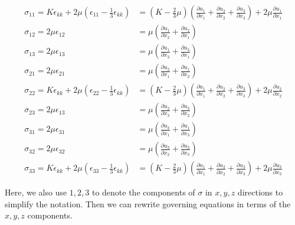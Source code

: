 \begin{align}
    \sigma_{11} = K\epsilon_{kk} + 2\mu (\epsilon_{11} - \frac{1}{3}\epsilon_{kk}) &= (K - \frac{2}{3}\mu)( \frac{\partial u_1}{\partial x_1} + \frac{\partial u_2}{\partial x_2} + \frac{\partial u_3}{\partial x_3}) + 2\mu \frac{\partial u_1}{\partial x_1} \\
    \sigma_{12} = 2\mu \epsilon_{12} &= \mu(\frac{\partial u_1}{\partial x_2} + \frac{\partial u_2}{\partial x_1}) \\
    \sigma_{13} = 2\mu \epsilon_{13} &= \mu(\frac{\partial u_1}{\partial x_3} + \frac{\partial u_3}{\partial x_1}) \\
    \sigma_{21} = 2\mu \epsilon_{21} &= \mu(\frac{\partial u_2}{\partial x_1} + \frac{\partial u_1}{\partial x_2}) \\
    \sigma_{22} = K\epsilon_{kk} + 2\mu (\epsilon_{22} - \frac{1}{3}\epsilon_{kk}) &= (K - \frac{2}{3}\mu)( \frac{\partial u_1}{\partial x_1} + \frac{\partial u_2}{\partial x_2} + \frac{\partial u_3}{\partial x_3}) + 2\mu \frac{\partial u_2}{\partial x_2} \\
    \sigma_{23} = 2\mu \epsilon_{13} &= \mu(\frac{\partial u_2}{\partial x_3} + \frac{\partial u_3}{\partial x_2}) \\
    \sigma_{31} = 2\mu \epsilon_{31} &= \mu(\frac{\partial u_3}{\partial x_1} + \frac{\partial u_1}{\partial x_3}) \\
    \sigma_{32} = 2\mu \epsilon_{32} &= \mu(\frac{\partial u_3}{\partial x_2} + \frac{\partial u_2}{\partial x_3}) \\
    \sigma_{33} = K\epsilon_{kk} + 2\mu (\epsilon_{33} - \frac{1}{3}\epsilon_{kk}) &= (K - \frac{2}{3}\mu)( \frac{\partial u_1}{\partial x_1} + \frac{\partial u_2}{\partial x_2} + \frac{\partial u_3}{\partial x_3}) + 2\mu \frac{\partial u_3}{\partial x_3}
    \label{eqn:sigma-tensor}
\end{align}


Here, we also use $1,2,3$ to denote the components of $\sigma$ in $x,y,z$ directions to simplify the notation.
Then we can rewrite governing equations in terms of the $x,y,z$ components.

